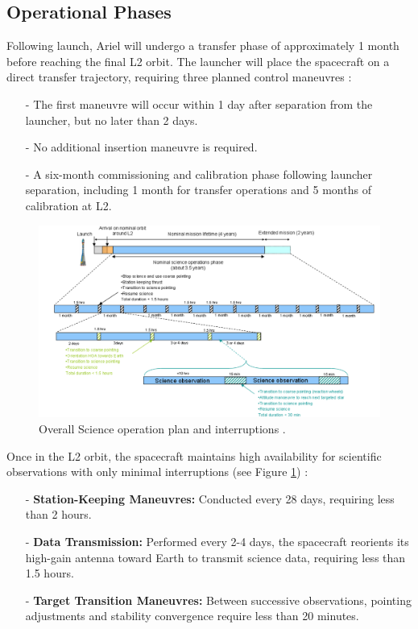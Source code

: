\documentclass[12pt]{article}
\begin{document}
\subsection{Operational Phases}

Following launch, Ariel will undergo a transfer phase of approximately 1 month before reaching the final L2 orbit. The launcher will place the spacecraft on a direct transfer trajectory, requiring three planned control maneuvres \cite{salvignol2024ariel}:

\begin{itemize}
    \item[-] The first maneuvre will occur within 1 day after separation from the launcher, but no later than 2 days.
    \item[-] No additional insertion maneuvre is required.
    \item[-] A six-month commissioning and calibration phase following launcher separation, including 1 month for transfer operations and 5 months of calibration at L2.
\end{itemize}

\begin{figure}[H]
    \centering
    \includegraphics[width=.9\textwidth]{science interruptions.png}
    \caption{\centering Overall Science operation plan and interruptions \protect\cite{salvignol2024ariel}.}
    \label{fig:7}
\end{figure}

Once in the L2 orbit, the spacecraft maintains high availability for scientific observations with only minimal interruptions (see Figure \ref{fig:7}) \cite{salvignol2024ariel}:

\begin{itemize}
    \item[-] \textbf{Station-Keeping Maneuvres:} Conducted every 28 days, requiring less than 2 hours.
    \item[-] \textbf{Data Transmission:} Performed every 2-4 days, the spacecraft reorients its high-gain antenna toward Earth to transmit science data, requiring less than 1.5 hours.
    \item[-] \textbf{Target Transition Maneuvres:} Between successive observations, pointing adjustments and stability convergence require less than 20 minutes.
\end{itemize}
\end{document}
